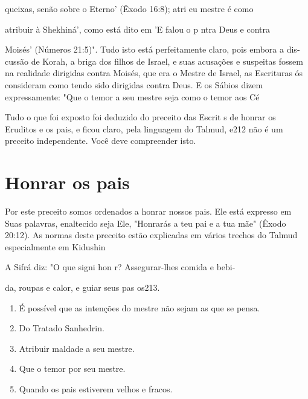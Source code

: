 \begin{itemize}
\begin{enumrate}
\begin{itemize}
\begin{itemize}
\begin{itemize}
queixas, senão sobre o Eterno' (Êxodo 16:8); atri eu mestre é como

atribuir à Shekhiná', como está dito em 'E falou o p ntra Deus e contra

Moisés' (Números 21:5)". Tudo isto está perfeitamente claro, pois embora
a dis­cussão de Korah, a briga dos filhos de Israel, e suas acusações e
suspeitas fos­sem na realidade dirigidas contra Moisés, que era o Mestre
de Israel, as Escritu­ras ós consideram como tendo sido dirigidas contra
Deus. E os Sábios dizem expressamente: "Que o temor a seu mestre seja
como o temor aos Cé

Tudo o que foi exposto foi deduzido do preceito das Escrit s de honrar
os Eruditos e os pais, e ficou claro, pela linguagem do Talmud, e212 não
é um preceito independente. Você deve compreender isto.

\section{Honrar os pais}

Por este preceito somos ordenados a honrar nossos pais. Ele está
ex­presso em Suas palavras, enaltecido seja Ele, "Honrarás a teu pai e a
tua mãe" (Êxodo 20:12). As normas deste preceito estão explicadas em
vários trechos do Talmud especialmente em Kidushin

A Sifrá diz: "O que signi hon r? Assegurar-lhes comida e bebi-

da, roupas e calor, e guiar seus pas os213.


\begin{enumerate}
\def\labelenumi{\arabic{enumi}.}
\setcounter{enumi}{208}
\item
 
 É possível que as intenções do mestre não sejam as que se pensa.
 
\item
 
 Do Tratado Sanhedrin.
 
\item
 
 Atribuir maldade a seu mestre.
 
\item
 
 Que o temor por seu mestre.
 
\item
 
 Quando os pais estiverem velhos e fracos.
 
\end{enumerate}



\end{itemize}
\end{itemize}
\end{itemize}
\end{enumrate}
\end{itemize}
